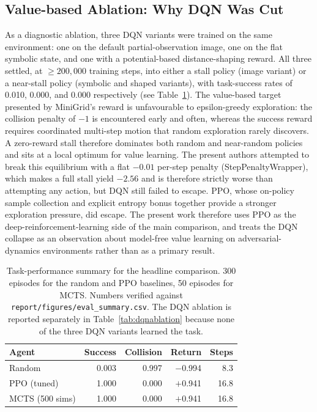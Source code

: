 \documentclass[conference]{IEEEtran}
\begin{document}
\subsection{Value-based Ablation: Why DQN Was Cut}
\label{sec:dqn-ablation}
As a diagnostic ablation, three DQN variants were trained on the same
environment: one on the default partial-observation image, one on the
flat symbolic state, and one with a potential-based distance-shaping
reward. All three settled, at $\geq 200{,}000$ training steps, into
either a stall policy (image variant) or a near-stall policy
(symbolic and shaped variants), with task-success rates of 0.010,
0.000, and 0.000 respectively (see Table~\ref{tab:taskperf}). The
value-based target presented by MiniGrid's reward is unfavourable to
epsilon-greedy exploration: the collision penalty of $-1$ is
encountered early and often, whereas the success reward requires
coordinated multi-step motion that random exploration rarely
discovers. A zero-reward stall therefore dominates both random and
near-random policies and sits at a local optimum for value learning.
The present authors attempted to break this equilibrium with a flat
$-0.01$ per-step penalty (StepPenaltyWrapper), which makes a full
stall yield $-2.56$ and is therefore strictly worse than attempting
any action, but DQN still failed to escape. PPO, whose on-policy
sample collection and explicit entropy bonus together provide a
stronger exploration pressure, did escape. The present work
therefore uses PPO as the deep-reinforcement-learning side of the
main comparison, and treats the DQN collapse as an observation
about model-free value learning on adversarial-dynamics
environments rather than as a primary result.

\begin{table}[t]
\centering
\caption{Task-performance summary for the headline comparison. 300
episodes for the random and PPO baselines, 50 episodes for MCTS.
Numbers verified against \texttt{report/figures/eval\_summary.csv}.
The DQN ablation is reported separately in
Table~\ref{tab:dqnablation} because none of the three DQN variants
learned the task.}
\label{tab:taskperf}
\begin{tabular}{lrrrr}
\toprule
Agent & Success & Collision & Return & Steps \\
\midrule
Random            & 0.003 & 0.997 & $-$0.994 & 8.3  \\
PPO (tuned)       & 1.000 & 0.000 & $+$0.941 & 16.8 \\
MCTS (500 sims)   & 1.000 & 0.000 & $+$0.941 & 16.8 \\
\bottomrule
\end{tabular}
\end{table}
\end{document}
